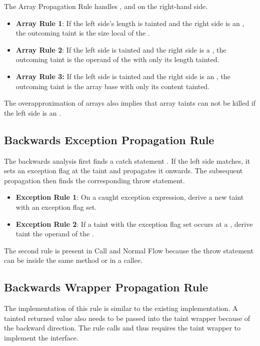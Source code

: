 \documentclass[../draft.tex]{subfiles}
\begin{document}
    The Array Propagation Rule handles ,  and  on the right-hand side.
    \begin{itemize}
        \item \textbf{Array Rule 1}: If the left side's length is tainted and the right side is an , the outcoming taint is the size local of the .
        \item  \textbf{Array Rule 2}: If the left side is tainted and the right side is a , the outcoming taint is the operand of the  with only its length tainted.
        \item \textbf{Array Rule 3:} If the left side is tainted and the right side is an , the outcoming taint is the array base with only its content tainted.
    \end{itemize}
    The overapproximation of arrays also implies that array taints can not be killed if the left side is an .

    \subsection{Backwards Exception Propagation Rule}
    The backwards analysis first finds a catch statement .
    If the left side matches, it sets an exception flag at the taint and propagates it onwards.
    The subsequent propagation then finds the corresponding throw statement.
    \begin{itemize}
        \item \textbf{Exception Rule 1}: On a caught exception expression, derive a new taint with an exception flag set.
        \item \textbf{Exception Rule 2}: If a taint with the exception flag set occurs at a , derive taint the operand of the .
    \end{itemize}
    The second rule is present in Call and Normal Flow because the throw statement can be inside the same method or in a callee.

    \subsection{Backwards Wrapper Propagation Rule}
    The implementation of this rule is similar to the existing implementation.
    A tainted returned value also needs to be passed into the taint wrapper because of the backward direction.
    The rule calls  and thus requires the taint wrapper to implement the  interface.
\end{document}
